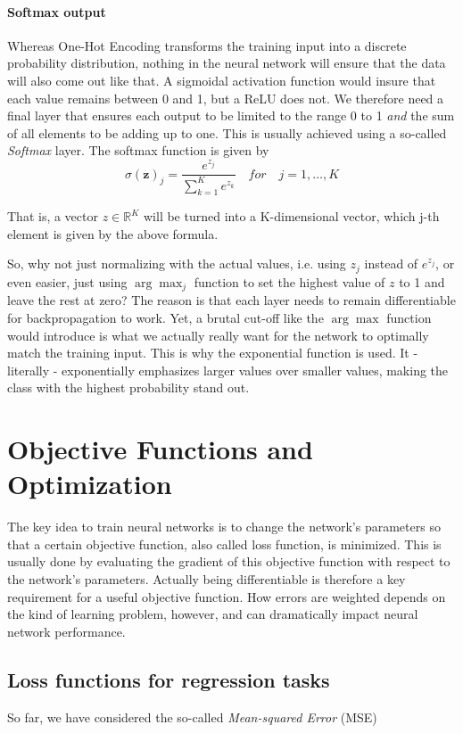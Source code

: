 \paragraph{Softmax output} Whereas One-Hot Encoding transforms the training input into a discrete probability distribution, nothing in the neural network will ensure that the data will also come out like that. A sigmoidal activation function would insure that each value remains between 0 and 1, but a ReLU does not. We therefore need a final layer that ensures each output to be limited to the range 0 to 1 \textsl{and} the sum of all elements to be adding up to one. This is usually achieved using a so-called \textsl{Softmax} layer. The softmax function is given by
\begin{equation}
{\sigma (\mathbf {z} )_{j}={\frac {e^{z_{j}}}{\sum _{k=1}^{K}e^{z_{k}}}}} \quad for \quad j=1,\ldots,K
\end{equation}

That is, a vector $z \in \mathbb{R}^K$ will be turned into a K-dimensional vector, which j-th element is given by the above formula.

So, why not just normalizing with the actual values, i.e. using $z_j$ instead of $e^{z_j}$, or even easier, just using $\arg \max_j$ function to set the highest value of $z$ to 1 and leave the rest at zero? The reason is that each layer needs to remain differentiable for backpropagation to work. Yet, a brutal cut-off like the $\arg \max$ function would introduce is what we actually really want for the network to optimally match the training input. This is why the exponential function is used. It - literally - exponentially emphasizes larger values over smaller values, making the class with the highest probability stand out.

\section{Objective Functions and Optimization}
The key idea to train neural networks is to change the network's parameters so that a certain objective function, also called loss function, is minimized. This is usually done by evaluating the gradient of this objective function with respect to the network's parameters. Actually being differentiable is therefore a key requirement for a useful objective function. How errors are weighted depends on the kind of learning problem, however, and can dramatically impact neural network performance.

\subsection{Loss functions for regression tasks}
So far, we have considered the so-called \emph{Mean-squared Error} (MSE)

